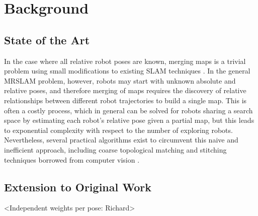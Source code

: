 \section{Background}
\label{S:Back}

\subsection{State of the Art}
\label{SS:Back:SOA}
    
    In the case where all relative robot poses are known, merging maps is a trivial problem using small modifications to existing SLAM techniques \cite{thrun2001probabilistic}. In the general MRSLAM problem, however, robots may start with unknown absolute and relative poses, and therefore merging of maps requires the discovery of relative relationships between different robot trajectories to build a single map. This is often a costly process, which in general can be solved for robots sharing a search space by estimating each robot's relative pose given a partial map, but this leads to exponential complexity with respect to the number of exploring robots\cite{fox2006distributed}. Nevertheless, several practical algorithms exist to circumvent this naive and inefficient approach,  including coarse topological matching and stitching techniques borrowed from computer vision \cite{birk2006merging}.


\subsection{Extension to Original Work\cite{howard2006multi}}
\label{SS:Back:Contributions}
    <Independent weights per pose: Richard>